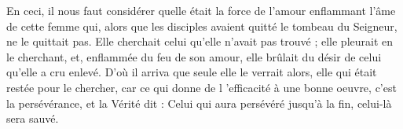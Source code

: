  En ceci, il nous faut considérer quelle était la force de l'amour enflammant l'âme de cette femme qui, alors que les disciples avaient quitté le tombeau du Seigneur, ne le quittait pas. Elle cherchait celui qu’elle n’avait pas trouvé ; elle pleurait en le cherchant, et, enflammée du feu de son amour, elle brûlait du désir de celui qu'elle a cru enlevé. D'où il arriva que seule elle le verrait alors, elle qui était restée pour le chercher, car ce qui donne de l ’efficacité à une bonne oeuvre, c’est la persévérance, et la Vérité dit : Celui qui aura persévéré jusqu’à la fin, celui-là sera sauvé.